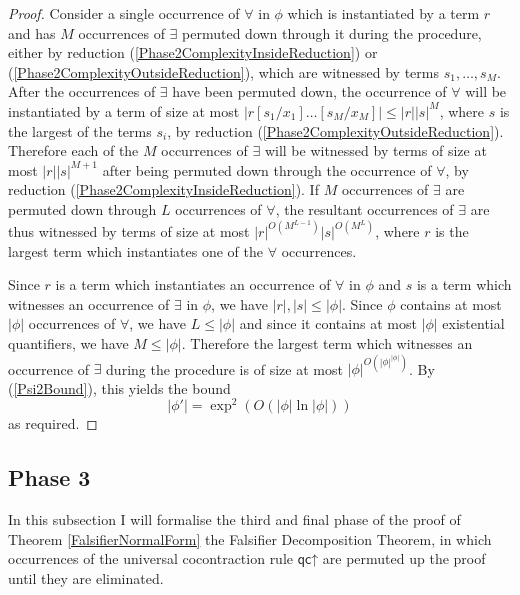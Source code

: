\documentclass[10pt]{article}
\theoremstyle{definition}\newtheorem{remark}[theorem]{Remark}
\theoremstyle{definition}\newtheorem{example}[theorem]{Example}
\theoremstyle{definition}\newtheorem{definition}[theorem]{Definition}
\newcommand{\qcUp}{{\mathsf{qc\mathord\uparrow}}}
\begin{document}
\begin{proof}
		Consider a single occurrence of $\forall$ in $\phi$ which is instantiated by a term $r$ and has $M$ occurrences of $\exists$ permuted down through it during the procedure, either by reduction (\ref{Phase2ComplexityInsideReduction}) or (\ref{Phase2ComplexityOutsideReduction}), which are witnessed by terms $s_1, \dots, s_M$. After the occurrences of $\exists$ have been permuted down, the occurrence of $\forall$ will be instantiated by a term of size at most $| r [s_1 / x_1] \dots [s_M / x_M] | \leq | r | | s |^M$, where $s$ is the largest of the terms $s_i$, by reduction (\ref{Phase2ComplexityOutsideReduction}). Therefore each of the $M$ occurrences of $\exists$ will be witnessed by terms of size at most $| r | | s |^{M + 1}$ after being permuted down through the occurrence of $\forall$, by reduction (\ref{Phase2ComplexityInsideReduction}). If $M$ occurrences of $\exists$ are permuted down through $L$ occurrences of $\forall$, the resultant occurrences of $\exists$ are thus witnessed by terms of size at most $| r |^{O(M^{L - 1})} | s |^{O(M^L)}$, where $r$ is the largest term which instantiates one of the $\forall$ occurrences.
		
		Since $r$ is a term which instantiates an occurrence of $\forall$ in $\phi$ and $s$ is a term which witnesses an occurrence of $\exists$ in $\phi$, we have $| r |, | s | \leq | \phi |$. Since $\phi$ contains at most $| \phi |$ occurrences of $\forall$, we have $L \leq | \phi |$ and since it contains at most $| \phi |$ existential quantifiers, we have $M \leq | \phi |$. Therefore the largest term which witnesses an occurrence of $\exists$ during the procedure is of size at most $| \phi | ^{O(| \phi |^{| \phi |})}$. By (\ref{Psi2Bound}), this yields the bound
		\begin{equation*}\label{Psi2FinalBound}
			| \phi' | = \exp^2 (O(| \phi | \ln | \phi |))
		\end{equation*}
		as required.
	\end{proof}

	\subsection{Phase 3}\label{Phase3Section}
	
	In this subsection I will formalise the third and final phase of the proof of Theorem \ref{FalsifierNormalForm} the Falsifier Decomposition Theorem, in which occurrences of the universal cocontraction rule $\qcUp$ are permuted up the proof until they are eliminated.
	
\end{document}

